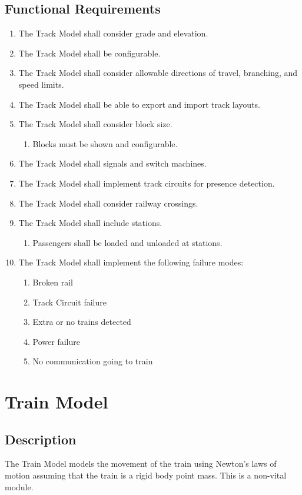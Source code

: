 \documentclass{scrreprt}
\begin{document}
\subsection{Functional Requirements}
\begin{enumerate}
    \item The Track Model shall consider grade and elevation.
    \item The Track Model shall be configurable.
    \item The Track Model shall consider allowable directions of travel, branching, and speed limits.
    \item The Track Model shall be able to export and import track layouts.
    \item The Track Model shall consider block size.
    \begin{enumerate}
        \item Blocks must be shown and configurable.
    \end{enumerate}
    \item The Track Model shall signals and switch machines.
    \item The Track Model shall implement track circuits for presence detection.
    \item The Track Model shall consider railway crossings.
    \item The Track Model shall include stations.
    \begin{enumerate}
        \item Passengers shall be loaded and unloaded at stations.
    \end{enumerate}
    \item The Track Model shall implement the following failure modes:
    \begin{enumerate}
        \item Broken rail
        \item Track Circuit failure
        \item Extra or no trains detected
        \item Power failure
        \item No communication going to train
    \end{enumerate}
\end{enumerate}

\section{Train Model}

\subsection{Description}
The Train Model models the movement of the train using Newton's laws of motion
assuming that the train is a rigid body point mass. This is a non-vital module.
\end{document}
